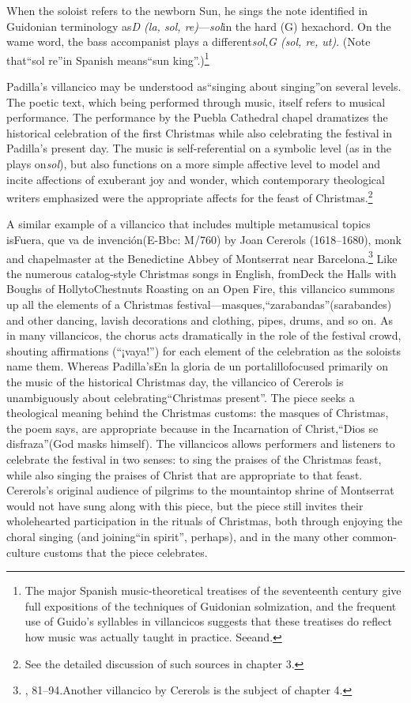 \documentclass{memoir}
\begin{document}
When the soloist refers to the newborn Sun, he sings the note identified in Guidonian terminology as\emph{D (la, sol, re)}—\emph{sol}in the hard (G) hexachord. On the wame word, the bass accompanist plays a different\emph{sol},\emph{G (sol, re, ut)}. (Note that\enquote{sol re}in Spanish means\enquote{sun king}.)\footnote{The major Spanish music-theoretical treatises of the seventeenth century give full expositions of the techniques of Guidonian solmization, and the frequent use of Guido's syllables in villancicos suggests that these treatises do reflect how music was actually taught in practice. Seeand.}


Padilla's villancico may be understood as\enquote{singing about singing}on several levels. The poetic text, which being performed through music, itself refers to musical performance. The performance by the Puebla Cathedral chapel dramatizes the historical celebration of the first Christmas while also celebrating the festival in Padilla’s present day. The music is self-referential on a symbolic level (as in the plays on\emph{sol}), but also functions on a more simple affective level to model and incite affections of exuberant joy and wonder, which contemporary theological writers emphasized were the appropriate affects for the feast of Christmas.\footnote{See the detailed discussion of such sources in chapter 3.}


A similar example of a villancico that includes multiple metamusical topics isFuera, que va de invención(E-Bbc: M/760) by Joan Cererols (1618–1680), monk and chapelmaster at the Benedictine Abbey of Montserrat near Barcelona.\footnote{, 81–94.Another villancico by Cererols is the subject of chapter 4.}
Like the numerous catalog-style Christmas songs in English, fromDeck the Halls with Boughs of HollytoChestnuts Roasting on an Open Fire, this villancico summons up all the elements of a Christmas festival—masques,\enquote{zarabandas}(sarabandes) and other dancing, lavish decorations and clothing, pipes, drums, and so on. As in many villancicos, the chorus acts dramatically in the role of the festival crowd, shouting affirmations (\enquote{¡vaya!}) for each element of the celebration as the soloists name them. Whereas Padilla’sEn la gloria de un portalillofocused primarily on the music of the historical Christmas day, the villancico of Cererols is unambiguously about celebrating\enquote{Christmas present}. The piece seeks a theological meaning behind the Christmas customs: the masques of Christmas, the poem says, are appropriate because in the Incarnation of Christ,\enquote{Dios se disfraza}(God masks himself). The villancicos allows performers and listeners to celebrate the festival in two senses: to sing the praises of the Christmas feast, while also singing the praises of Christ that are appropriate to that feast. Cererols’s original audience of pilgrims to the mountaintop shrine of Montserrat would not have sung along with this piece, but the piece still invites their wholehearted participation in the rituals of Christmas, both through enjoying the choral singing (and joining\enquote{in spirit}, perhaps), and in the many other common-culture customs that the piece celebrates.

\printbibliography
\end{document}

